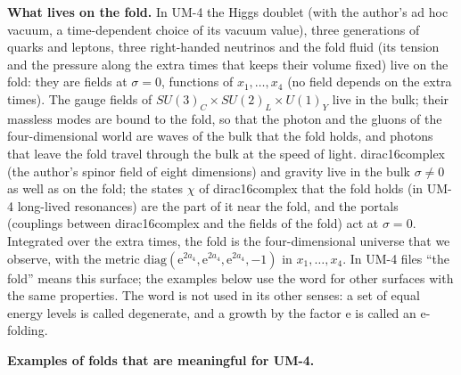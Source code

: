 \documentclass[
  10pt,
]{article}
\begin{document}
\textbf{What lives on the fold.} In UM-4 the Higgs doublet (with the
author's ad hoc vacuum, a time-dependent choice of its vacuum value),
three generations of quarks and leptons, three right-handed neutrinos
and the fold fluid (its tension and the pressure along the extra times
that keeps their volume fixed) live on the fold: they are fields at
\(\sigma = 0\), functions of \(x_1, \dots, x_4\) (no field depends on
the extra times). The gauge fields of
\(SU(3)_C \times SU(2)_L \times U(1)_Y\) live in the bulk; their
massless modes are bound to the fold, so that the photon and the gluons
of the four-dimensional world are waves of the bulk that the fold holds,
and photons that leave the fold travel through the bulk at the speed of
light. dirac16complex (the author's spinor field of eight dimensions)
and gravity live in the bulk \(\sigma \ne 0\) as well as on the fold;
the states \(\chi\) of dirac16complex that the fold holds (in UM-4
long-lived resonances) are the part of it near the fold, and the portals
(couplings between dirac16complex and the fields of the fold) act at
\(\sigma = 0\). Integrated over the extra times, the fold is the
four-dimensional universe that we observe, with the metric
\(\mathrm{diag}(\mathrm{e}^{2a_4}, \mathrm{e}^{2a_4}, \mathrm{e}^{2a_4}, -1)\)
in \(x_1, \dots, x_4\). In UM-4 files ``the fold'' means this surface;
the examples below use the word for other surfaces with the same
properties. The word is not used in its other senses: a set of equal
energy levels is called degenerate, and a growth by the factor
\(\mathrm{e}\) is called an e-folding.

\textbf{Examples of folds that are meaningful for UM-4.}
\end{document}
